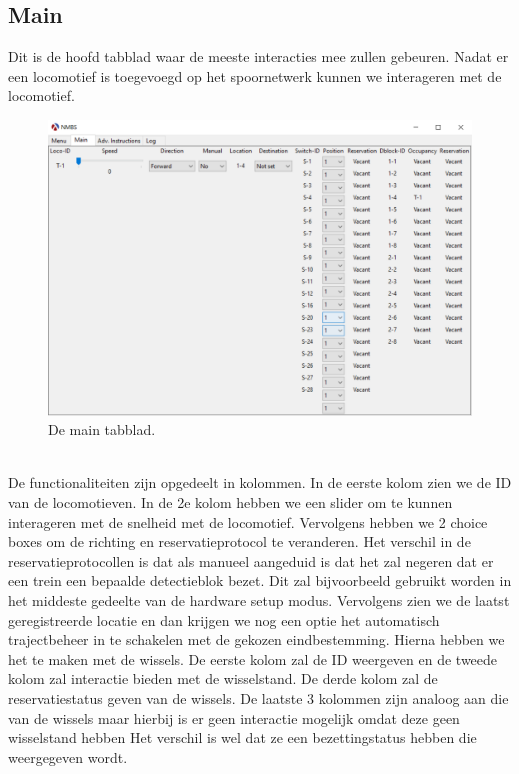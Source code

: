 \documentclass{article}
\begin{document}
\subsection{Main}
Dit is de hoofd tabblad waar de meeste interacties mee zullen gebeuren. Nadat er een locomotief is toegevoegd op 
het spoornetwerk kunnen we interageren met de locomotief.
\begin{figure}[h]
    \centering
    \includegraphics[width=\textwidth]{Images/Screenshot_5.png}
    \caption{De main tabblad.}
\end{figure}
\\
De functionaliteiten zijn opgedeelt in kolommen. In de eerste kolom zien we de ID van de locomotieven. In de 2e kolom hebben we een slider 
om te kunnen interageren met de snelheid met de locomotief. Vervolgens hebben we 2 choice boxes om de richting en reservatieprotocol te veranderen.
Het verschil in de reservatieprotocollen is dat als manueel aangeduid is dat het zal negeren dat er een trein een bepaalde
detectieblok bezet. Dit zal bijvoorbeeld gebruikt worden in het middeste gedeelte van de hardware setup modus. 
Vervolgens zien we de laatst geregistreerde locatie en dan krijgen we nog een optie het automatisch trajectbeheer in te schakelen met de gekozen eindbestemming.
Hierna hebben we het te maken met de wissels. De eerste kolom zal de ID weergeven en de tweede kolom zal interactie bieden met de wisselstand. De derde kolom zal de 
reservatiestatus geven van de wissels. De laatste 3 kolommen zijn analoog aan die van de wissels maar hierbij is er geen interactie mogelijk omdat deze geen wisselstand hebben
Het verschil is wel dat ze een bezettingstatus hebben die weergegeven wordt. 
\end{document}
